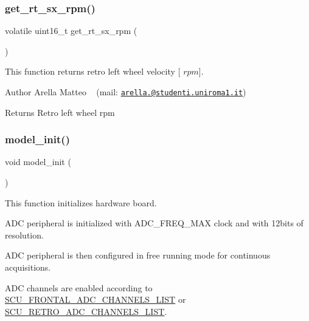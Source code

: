\subsubsection{\texorpdfstring{get\+\_\+rt\+\_\+sx\+\_\+rpm()}{get\_rt\_sx\_rpm()}}
{\footnotesize\ttfamily volatile uint16\+\_\+t get\+\_\+rt\+\_\+sx\+\_\+rpm (\begin{DoxyParamCaption}{ }\end{DoxyParamCaption})}



This function returns retro left wheel velocity \mbox{[} $rpm$\mbox{]}. 

\begin{DoxyAuthor}{Author}
Arella Matteo ~\newline
 (mail\+: \href{mailto:arella.1646983@studenti.uniroma1.it}{\tt arella.@studenti.\+uniroma1.\+it})
\end{DoxyAuthor}
\begin{DoxyReturn}{Returns}
Retro left wheel rpm 
\end{DoxyReturn}
\mbox{\label{group___board__model__group_gace5a444da39d4366693503c53f0841c2}} 
\subsubsection{\texorpdfstring{model\+\_\+init()}{model\_init()}}
{\footnotesize\ttfamily void model\+\_\+init (\begin{DoxyParamCaption}{ }\end{DoxyParamCaption})}



This function initializes hardware board. 

A\+DC peripheral is initialized with A\+D\+C\+\_\+\+F\+R\+E\+Q\+\_\+\+M\+AX clock and with 12bits of resolution.

A\+DC peripheral is then configured in free running mode for continuous acquisitions.

A\+DC channels are enabled according to \mbox{\hyperlink{group___board__model__group_ga1b36d02d5fef3342ea7159722fa50ff3}{S\+C\+U\+\_\+\+F\+R\+O\+N\+T\+A\+L\+\_\+\+A\+D\+C\+\_\+\+C\+H\+A\+N\+N\+E\+L\+S\+\_\+\+L\+I\+ST}} or \mbox{\hyperlink{group___board__model__group_ga5190c5da456959fb6c7132518a51f12f}{S\+C\+U\+\_\+\+R\+E\+T\+R\+O\+\_\+\+A\+D\+C\+\_\+\+C\+H\+A\+N\+N\+E\+L\+S\+\_\+\+L\+I\+ST}}.

